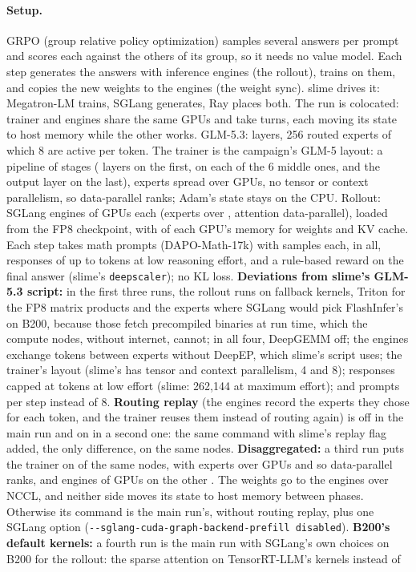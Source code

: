 \paragraph{Setup.} GRPO (group relative policy optimization) samples several answers per prompt and scores each against the others of its group, so it needs no value model. Each step generates the answers with inference engines (the rollout), trains on them, and copies the new weights to the engines (the weight sync). slime drives it: Megatron-LM trains, SGLang generates, Ray places both. The run is colocated: trainer and engines share the same GPUs and take turns, each moving its state to host memory while the other works. GLM-5.3: \TriGrLayers{} layers, 256 routed experts of which 8 are active per token. The trainer is the campaign's GLM-5 layout: a pipeline of \TriGrPp{} stages (\TriGrFirstLayers{} layers on the first, \TriGrMidLayers{} on each of the 6 middle ones, \TriGrLastLayers{} and the output layer on the last), experts spread over \TriGrEp{} GPUs, no tensor or context parallelism, so \TriGrDp{} data-parallel ranks; Adam's state stays on the CPU. Rollout: \TriGrEngines{} SGLang engines of \TriGrEngineGpus{} GPUs each (experts over \TriGrEngineGpus, attention data-parallel), loaded from the FP8 checkpoint, with \TriGrMemFraction{} of each GPU's memory for weights and KV cache. Each step takes \TriGrPrompts{} math prompts (DAPO-Math-17k) with \TriGrSamplesPer{} samples each, \TriGrSamples{} in all, responses of up to \TriGrMaxResp{} tokens at low reasoning effort, and a rule-based reward on the final answer (slime's \texttt{deepscaler}); no KL loss. \textbf{Deviations from slime's GLM-5.3 script:} in the first three runs, the rollout runs on fallback kernels, Triton for the FP8 matrix products and the experts where SGLang would pick FlashInfer's on B200, because those fetch precompiled binaries at run time, which the compute nodes, without internet, cannot; in all four, DeepGEMM off; the engines exchange tokens between experts without DeepEP, which slime's script uses; the trainer's layout (slime's has tensor and context parallelism, 4 and 8); responses capped at \TriGrMaxResp{} tokens at low effort (slime: 262,144 at maximum effort); and \TriGrPrompts{} prompts per step instead of 8. \textbf{Routing replay} (the engines record the experts they chose for each token, and the trainer reuses them instead of routing again) is off in the main run and on in a second one: the same command with slime's replay flag added, the only difference, on the same \TriGrNodes{} nodes. \textbf{Disaggregated:} a third run puts the trainer on \TriGrDgTrainerNodes{} of the same \TriGrNodes{} nodes, with experts over \TriGrDgEp{} GPUs and so \TriGrDgDp{} data-parallel ranks, and \TriGrDgEngines{} engines of \TriGrEngineGpus{} GPUs on the other \TriGrDgEngineNodes. The weights go to the engines over NCCL, and neither side moves its state to host memory between phases. Otherwise its command is the main run's, without routing replay, plus one SGLang option (\texttt{-{}-sglang-cuda-graph-backend-prefill disabled}). \textbf{B200's default kernels:} a fourth run is the main run with SGLang's own choices on B200 for the rollout: the sparse attention on TensorRT-LLM's kernels instead of 